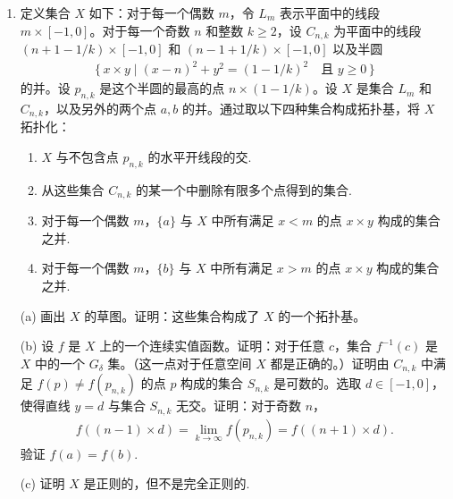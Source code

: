 \begin{enumerate}
\textbf{定理}\quad 每一个拓扑群都是完全正则的。

证明：在拓扑群 $G$ 中，设 $V_{0}$ 是单位元 $e$ 的一个邻域。一般地，选取 $e$ 的一个邻域 $V_{n}$，使得 $V_{n}\cdot V_{n}\subset V_{n-1}$。考虑所有二进制有理数 $p$ 构成的集合，即所有形如 $k/2^{n}$ 的有理数，其中 $k$ 和 $n$ 都是整数。对于 $(0,1]$ 中的每一个二进制有理数 $p$，给出一个开集 $U(p)$，其中 $U(p)$ 用以下方式归纳定义：$U(1)=V_{0}$，并且 $U\big(\frac{1}{2}\big)=V_{1}$。给定 $n$，假设对于 $0<k/2^{n}\leqslant 1$，$U(k/2^{n})$ 已有定义，然后对于 $0<k<2^{n}$ 定义
\begin{align*}
U(1/2^{n+1})=V_{n+1},
\end{align*}
\begin{align*}
U((2k+1)/2^{n+1})=V_{n+1}\cdot U(k/2^{n}).
\end{align*}
对于 $p\leqslant 0$，令 $U(p)=\varnothing$。对于 $p>1$，令 $U(p)=G$。证明对于所有的 $k$ 和 $n$，
\begin{align*}
V_{n}\cdot U(k/2^{n})\subset U((k+1)/2^{n}).
\end{align*}
后面的证法如 Urysohn 引理的证明。

这个习题来自 [M-Z]，读者可以在那里看到更多的关于拓扑群的结论。
\item 定义集合 $X$ 如下：对于每一个偶数 $m$，令 $L_{m}$ 表示平面中的线段 $m\times[-1,0]$。对于每一个奇数 $n$ 和整数 $k\geqslant 2$，设 $C_{n,k}$ 为平面中的线段 $(n+1-1/k)\times[-1,0]$ 和 $(n-1+1/k)\times[-1,0]$ 以及半圆
\begin{align*}
\{\,x\times y\mid(x-n)^{2}+y^{2}=(1-1/k)^{2}\quad\text{且 }y\geqslant 0\,\}
\end{align*}
的并。设 $p_{n,k}$ 是这个半圆的最高的点 $n\times(1-1/k)$。设 $X$ 是集合 $L_{m}$ 和 $C_{n,k}$，以及另外的两个点 $a,b$ 的并。通过取以下四种集合构成拓扑基，将 $X$ 拓扑化：
\begin{enumerate}
\item $X$ 与不包含点 $p_{n,k}$ 的水平开线段的交.
\item 从这些集合 $C_{n,k}$ 的某一个中删除有限多个点得到的集合.
\item 对于每一个偶数 $m$，$\{a\}$ 与 $X$ 中所有满足 $x<m$ 的点 $x\times y$ 构成的集合之并.
\item 对于每一个偶数 $m$，$\{b\}$ 与 $X$ 中所有满足 $x>m$ 的点 $x\times y$ 构成的集合之并.
\end{enumerate}
(a) 画出 $X$ 的草图。证明：这些集合构成了 $X$ 的一个拓扑基。

(b) 设 $f$ 是 $X$ 上的一个连续实值函数。证明：对于任意 $c$，集合 $f^{-1}(c)$ 是 $X$ 中的一个 $G_{\delta}$ 集。（这一点对于任意空间 $X$ 都是正确的。）证明由 $C_{n,k}$ 中满足 $f(p)\neq f(p_{n,k})$ 的点 $p$ 构成的集合 $S_{n,k}$ 是可数的。选取 $d\in[-1,0]$，使得直线 $y=d$ 与集合 $S_{n,k}$ 无交。证明：对于奇数 $n$，
\begin{align*}
f((n-1)\times d)=\lim_{k\to\infty}f(p_{n,k})=f((n+1)\times d).
\end{align*}
验证 $f(a)=f(b)$.

(c) 证明 $X$ 是正则的，但不是完全正则的.
\end{enumerate}